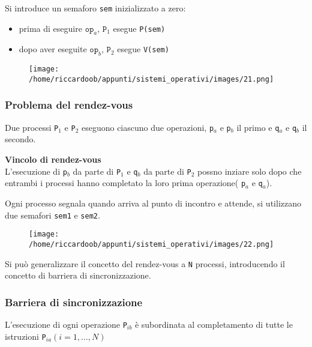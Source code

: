 Si introduce un semaforo \texttt{sem} inizializzato a zero:
\begin{itemize}
    \item prima di eseguire $\texttt{op}_a$, $\texttt{P}_1$ esegue \texttt{P(sem)}
    \item dopo aver eseguite $\texttt{op}_b$, $\texttt{P}_2$ esegue \texttt{V(sem)}
\end{itemize}

\begin{figure}[H]
    \centering
    \texttt{[image: /home/riccardoob/appunti/sistemi\_operativi/images/21.png]}
\end{figure}

\subsubsection{Problema del rendez-vous}
Due processi \texttt{P}$_1$ e \texttt{P}$_2$ eseguono ciascuno due operazioni, \texttt{p}$_a$ e \texttt{p}$_b$ il primo e \texttt{q}$_a$ e \texttt{q}$_b$ il secondo.

\begin{mdframed}[topline=false,bottomline=false,rightline=false]
    \textbf{Vincolo di rendez-vous}\\
    L'esecuzione di \texttt{p}$_b$ da parte di \texttt{P}$_1$ e \texttt{q}$_b$ da parte di \texttt{P}$_2$ possno inziare solo dopo che entrambi i processi hanno completato la loro prima operazione( \texttt{p}$_a$ e \texttt{q}$_a$).
\end{mdframed}

Ogni processo segnala quando arriva al punto di incontro e attende, si utilizzano due semafori \texttt{sem1} e \texttt{sem2}.

\begin{figure}[H]
    \centering
    \texttt{[image: /home/riccardoob/appunti/sistemi\_operativi/images/22.png]}
\end{figure}

Si può generalizzare il concetto del rendez-vous a \texttt{N} processi, introducendo il concetto di barriera di sincronizzazione.

\subsubsection{Barriera di sincronizzazione}
L'esecuzione di ogni operazione \texttt{P}$_{ib}$ è subordinata al completamento di tutte le istruzioni \texttt{P}$_{ia} (i=1,\dots,N)$

